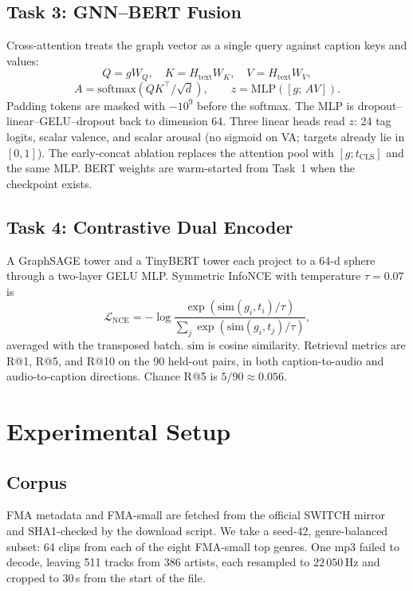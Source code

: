 \documentclass[conference]{IEEEtran}
\begin{document}
\subsection{Task 3: GNN--BERT Fusion}
Cross-attention treats the graph vector as a single query against caption keys and values:
\begin{equation}
Q=gW_Q,\quad K=H_{\mathrm{text}}W_K,\quad V=H_{\mathrm{text}}W_V,
\end{equation}
\begin{equation}
A=\mathrm{softmax}(QK^{\top}/\sqrt{d}),\qquad
z=\mathrm{MLP}([g;\,AV]).
\end{equation}
Padding tokens are masked with $-10^{9}$ before the softmax. The MLP is dropout--linear--GELU--dropout back to dimension 64. Three linear heads read $z$: 24 tag logits, scalar valence, and scalar arousal (no sigmoid on VA; targets already lie in $[0,1]$). The early-concat ablation replaces the attention pool with $[g;t_{\mathrm{CLS}}]$ and the same MLP. BERT weights are warm-started from Task~1 when the checkpoint exists.

\subsection{Task 4: Contrastive Dual Encoder}
A GraphSAGE tower and a TinyBERT tower each project to a 64-d sphere through a two-layer GELU MLP. Symmetric InfoNCE with temperature $\tau=0.07$ is
\begin{equation}
\mathcal{L}_{\mathrm{NCE}}=-\log\frac{\exp(\mathrm{sim}(g_i,t_i)/\tau)}{\sum_j\exp(\mathrm{sim}(g_i,t_j)/\tau)},
\end{equation}
averaged with the transposed batch. $\mathrm{sim}$ is cosine similarity. Retrieval metrics are R@1, R@5, and R@10 on the 90 held-out pairs, in both caption-to-audio and audio-to-caption directions. Chance R@5 is $5/90\approx 0.056$.

\section{Experimental Setup}
\label{sec:data}

\subsection{Corpus}
FMA metadata and FMA-small are fetched from the official SWITCH mirror~\cite{defferrard2017} and SHA1-checked by the download script. We take a seed-42, genre-balanced subset: 64 clips from each of the eight FMA-small top genres. One mp3 failed to decode, leaving 511 tracks from 386 artists, each resampled to $22\,050$\,Hz and cropped to 30\,s from the start of the file.
\end{document}
